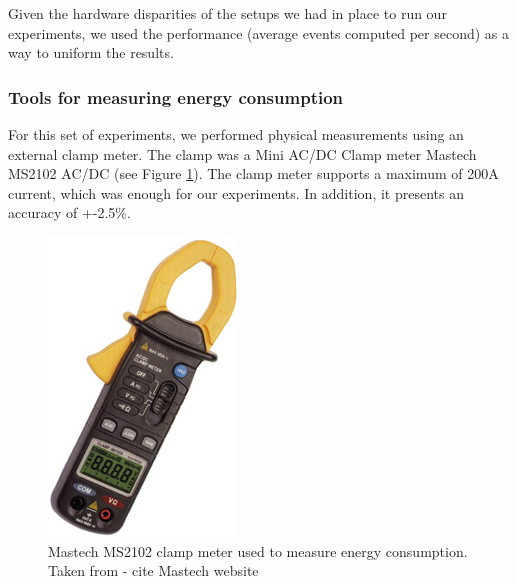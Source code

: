 Given the hardware disparities of the setups we had in place to run our experiments, we used the performance (average events computed per second) as a way to uniform the results.

\subsubsection*{Tools for measuring energy consumption}
For this set of experiments, we performed physical measurements using an external clamp meter. The clamp was a Mini AC/DC Clamp meter
Mastech MS2102 AC/DC (see Figure \ref{fig:clamp}). The clamp meter supports a maximum of 200A current, which was enough for our experiments. In addition, it presents an accuracy of +-2.5\%.

\begin{figure}[]
  \centering
    \includegraphics[scale=2.5]{"img/clamp"}
    \caption{Mastech MS2102 clamp meter used to measure energy consumption. Taken from \cite{} - cite Mastech website}
    \label{fig:clamp}
\end{figure}


